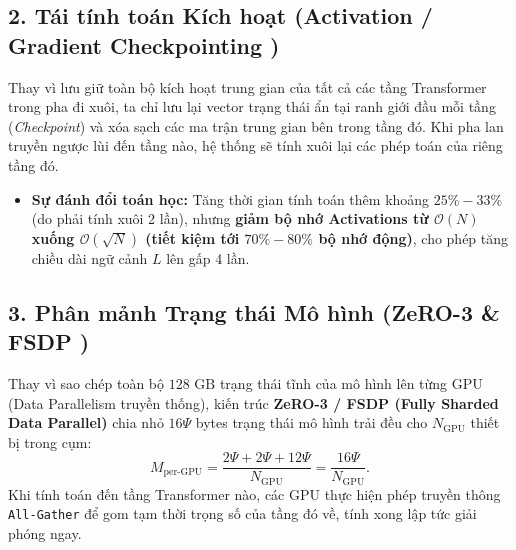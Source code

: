\subsection{2. Tái tính toán Kích hoạt (Activation / Gradient Checkpointing \citealt{chen2016training})}
Thay vì lưu giữ toàn bộ kích hoạt trung gian của tất cả các tầng Transformer trong pha đi xuôi, ta chỉ lưu lại vector trạng thái ẩn tại ranh giới đầu mỗi tầng (\textit{Checkpoint}) và xóa sạch các ma trận trung gian bên trong tầng đó. Khi pha lan truyền ngược lùi đến tầng nào, hệ thống sẽ tính xuôi lại các phép toán của riêng tầng đó.
\begin{itemize}[leftmargin=1.2cm]
    \item \textbf{Sự đánh đổi toán học:} Tăng thời gian tính toán thêm khoảng $25\% - 33\%$ (do phải tính xuôi 2 lần), nhưng \textbf{giảm bộ nhớ Activations từ $\mathcal{O}(N)$ xuống $\mathcal{O}(\sqrt{N})$ (tiết kiệm tới $70\% - 80\%$ bộ nhớ động)}, cho phép tăng chiều dài ngữ cảnh $L$ lên gấp 4 lần.
\end{itemize}

\subsection{3. Phân mảnh Trạng thái Mô hình (ZeRO-3 \& FSDP \citealt{rajbhandari2020zero, zhao2023pytorch})}
Thay vì sao chép toàn bộ $128\text{ GB}$ trạng thái tĩnh của mô hình lên từng GPU (Data Parallelism truyền thống), kiến trúc \textbf{ZeRO-3 / FSDP (Fully Sharded Data Parallel)} chia nhỏ $16\Psi$ bytes trạng thái mô hình trải đều cho $N_{\text{GPU}}$ thiết bị trong cụm:
\begin{equation}
    M_{\text{per-GPU}} = \frac{2\Psi + 2\Psi + 12\Psi}{N_{\text{GPU}}} = \frac{16\Psi}{N_{\text{GPU}}}.
\end{equation}
Khi tính toán đến tầng Transformer nào, các GPU thực hiện phép truyền thông \texttt{All-Gather} để gom tạm thời trọng số của tầng đó về, tính xong lập tức giải phóng ngay.

